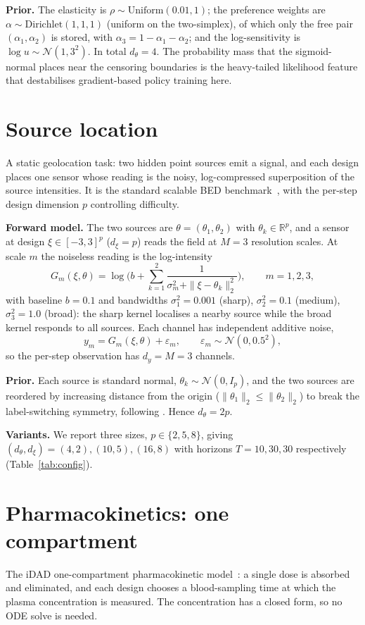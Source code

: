 \textbf{Prior.} The elasticity is $\rho\sim\mathrm{Uniform}(0.01,1)$; the preference
weights are $\alpha\sim\mathrm{Dirichlet}(1,1,1)$ (uniform on the two-simplex), of which
only the free pair $(\alpha_1,\alpha_2)$ is stored, with $\alpha_3=1-\alpha_1-\alpha_2$;
and the log-sensitivity is $\log u\sim\mathcal N(1,3^2)$. In total $d_\theta=4$. The
probability mass that the sigmoid-normal places near the censoring boundaries is the
heavy-tailed likelihood feature that destabilises gradient-based policy training here.

\section{Source location}
A static geolocation task: two hidden point sources emit a signal, and each design places
one sensor whose reading is the noisy, log-compressed superposition of the source
intensities. It is the standard scalable BED
benchmark~\citep{foster2021deep,klein2026supercharging}, with the per-step design
dimension $p$ controlling difficulty.

\textbf{Forward model.} The two sources are $\theta=(\theta_1,\theta_2)$ with
$\theta_k\in\mathbb{R}^p$, and a sensor at design $\xi\in[-3,3]^p$ ($d_\xi=p$) reads the
field at $M=3$ resolution scales. At scale $m$ the noiseless reading is the log-intensity
\[
G_m(\xi,\theta)=\log\!\Big(b+\sum_{k=1}^{2}\frac{1}{\sigma_m^2+\|\xi-\theta_k\|_2^2}\Big),
\qquad m=1,2,3,
\]
with baseline $b=0.1$ and bandwidths $\sigma_1^2=0.001$ (sharp), $\sigma_2^2=0.1$
(medium), $\sigma_3^2=1.0$ (broad): the sharp kernel localises a nearby source while the
broad kernel responds to all sources. Each channel has independent additive noise,
\[
y_m=G_m(\xi,\theta)+\varepsilon_m,\qquad \varepsilon_m\sim\mathcal N(0,0.5^2),
\]
so the per-step observation has $d_y=M=3$ channels.

\textbf{Prior.} Each source is standard normal, $\theta_k\sim\mathcal N(0,I_p)$, and the
two sources are reordered by increasing distance from the origin
($\|\theta_1\|_2\le\|\theta_2\|_2$) to break the label-switching symmetry, following
\citet{klein2026supercharging}. Hence $d_\theta=2p$.

\textbf{Variants.} We report three sizes, $p\in\{2,5,8\}$, giving
$(d_\theta,d_\xi)=(4,2),(10,5),(16,8)$ with horizons $T=10,30,30$ respectively
(Table~\ref{tab:config}).

\section{Pharmacokinetics: one compartment}
The iDAD one-compartment pharmacokinetic model~\citep{ivanova2021implicit}: a single dose
is absorbed and eliminated, and each design chooses a blood-sampling time at which the
plasma concentration is measured. The concentration has a closed form, so no ODE solve is
needed.

